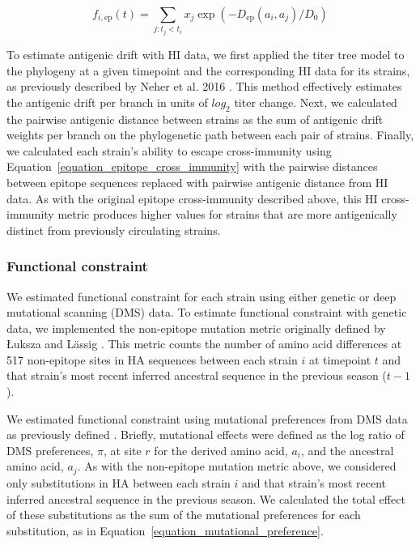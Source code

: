 \begin{equation}
    f_{i,\mathrm{ep}}(t) = \sum_{j: t_{j} < t_{i}}{x_{j}\exp{(-D_{\mathrm{ep}}(a_{i}, a_{j}) / D_{0})}}
    \label{equation_epitope_cross_immunity}
\end{equation}

To estimate antigenic drift with HI data, we first applied the titer tree model to the phylogeny at a given timepoint and the corresponding HI data for its strains, as previously described by Neher et al. 2016 \cite{Neher:2016hy}.
This method effectively estimates the antigenic drift per branch in units of $log_{2}$ titer change.
Next, we calculated the pairwise antigenic distance between strains as the sum of antigenic drift weights per branch on the phylogenetic path between each pair of strains.
Finally, we calculated each strain's ability to escape cross-immunity using Equation~\ref{equation_epitope_cross_immunity} with the pairwise distances between epitope sequences replaced with pairwise antigenic distance from HI data.
As with the original epitope cross-immunity described above, this HI cross-immunity metric produces higher values for strains that are more antigenically distinct from previously circulating strains.

\subsubsection*{Functional constraint}

We estimated functional constraint for each strain using either genetic or deep mutational scanning (DMS) data.
To estimate functional constraint with genetic data, we implemented the non-epitope mutation metric originally defined by {\L}uksza and L\"assig \cite{Luksza:2014hj}.
This metric counts the number of amino acid differences at 517 non-epitope sites in HA sequences between each strain $i$ at timepoint $t$ and that strain's most recent inferred ancestral sequence in the previous season ($t - 1$).

We estimated functional constraint using mutational preferences from DMS data as previously defined \cite{Lee2018}.
Briefly, mutational effects were defined as the log ratio of DMS preferences, $\pi$, at site $r$ for the derived amino acid, $a_{i}$, and the ancestral amino acid, $a_{j}$.
As with the non-epitope mutation metric above, we considered only substitutions in HA between each strain $i$ and that strain's most recent inferred ancestral sequence in the previous season.
We calculated the total effect of these substitutions as the sum of the mutational preferences for each substitution, as in Equation~\ref{equation_mutational_preference}.

